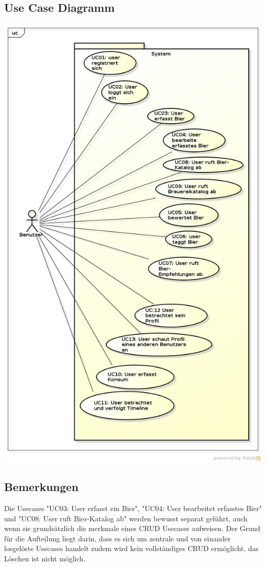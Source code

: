 \documentclass[10pt,a4paper]{scrartcl}
\begin{document}
\subsection{Use Case Diagramm}
\includegraphics[height=0.9\textheight]{UseCaseDiagramm.jpg}

\subsection{Bemerkungen}
Die Usecases "UC03: User erfasst ein Bier", "UC04: User bearbeitet erfasstes Bier" und "UC08: User ruft Bier-Katalog ab" werden bewusst separat geführt, auch wenn sie grundsätzlich die merkmale eines CRUD Usecases aufweisen. Der Grund für die Aufteilung liegt darin, dass es sich um zentrale und von einander losgelöste Usecases handelt zudem wird kein vollständiges CRUD ermöglicht, das Löschen ist nicht möglich.
\end{document}
